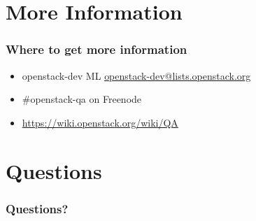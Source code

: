 \documentclass[aspectratio=43,11pt,hyperref={colorlinks=true}]{beamer}
\begin{document}
\section{More Information}
\begin{frame}
\frametitle{Where to get more information}
    \begin{itemize}
        \item openstack-dev ML\: \href{mailto:openstack-dev@lists.openstack.org}{openstack-dev@lists.openstack.org}
        \item \#openstack-qa on Freenode
        \item \href{https://wiki.openstack.org/wiki/QA}{https://wiki.openstack.org/wiki/QA}
    \end{itemize}
\end{frame}

\section{Questions}
\begin{frame}
\frametitle{Questions?}
\end{frame}
\end{document}
